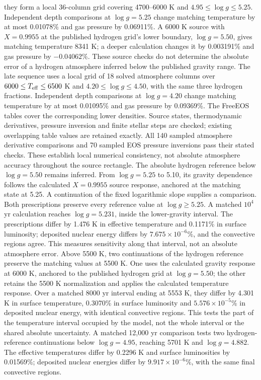 \documentclass[11pt,letterpaper]{article}
\begin{document}
they form a local 36-column grid covering 4700--6000 K and
$4.95\leq\log g\leq5.25$. Independent depth comparisons at $\log g=5.25$
change matching temperature by at most 0.01078\% and gas pressure by
0.06911\%. A 6000 K source with $X=0.9955$ at the published hydrogen grid's
lower boundary, $\log g=5.50$, gives matching temperature 8341 K;
a deeper calculation changes it by 0.003191\% and gas pressure by
$-0.04062\%$. These source checks do not determine the absolute error
of a hydrogen atmosphere inferred below the published gravity range.
The late sequence uses a local grid of 18 solved atmosphere columns over
$6000\leq T_{\rm eff}\leq6500$ K and $4.20\leq\log g\leq4.50$,
with the same three hydrogen fractions. Independent depth comparisons at
$\log g=4.20$ change matching temperature by at most 0.01095\% and gas
pressure by 0.09369\%. The FreeEOS tables cover the corresponding lower
densities. Source states, thermodynamic
derivatives, pressure inversion and finite stellar steps are checked;
existing overlapping table values are retained exactly. All 140 sampled
atmosphere derivative comparisons and 70 sampled EOS pressure inversions
pass their stated checks. These establish local numerical consistency,
not absolute atmosphere accuracy throughout the source rectangle.
The absolute hydrogen reference below $\log g=5.50$ remains inferred.
From $\log g=5.25$ to 5.10, its gravity dependence follows the calculated
$X=0.9955$ source response, anchored at the matching state at 5.25.
A continuation of the fixed logarithmic slope supplies a comparison.
Both prescriptions preserve every reference value at $\log g\geq5.25$.
A matched $10^4$ yr calculation reaches $\log g=5.231$, inside the
lower-gravity interval. The prescriptions differ by 1.476 K in effective
temperature and 0.1171\% in surface luminosity; deposited nuclear energy
differs by $7.675\times10^{-6}\%$, and the convective regions agree.
This measures sensitivity along that interval, not an absolute atmosphere error.
Above 5500 K, two continuations of the hydrogen reference preserve the
matching values at 5500 K. One uses the calculated gravity response at 6000 K,
anchored to the published hydrogen grid at $\log g=5.50$; the other retains
the 5500 K normalization and applies the calculated temperature response.
Over a matched 8000 yr interval ending at 5553 K, they differ by 4.301 K
in surface temperature, 0.3070\% in surface luminosity and
$5.576\times10^{-5}\%$ in deposited nuclear energy, with identical convective
regions. This tests the part of the temperature interval occupied by the
model, not the whole interval or the shared absolute uncertainty.
A matched 12,000 yr comparison tests two hydrogen-reference continuations
below $\log g=4.95$, reaching 5701 K and $\log g=4.882$.
The effective temperatures differ by 0.2296 K and surface luminosities by
0.01569\%; deposited nuclear energies differ by $9.917\times10^{-6}\%$,
with the same final convective regions.
\end{document}
